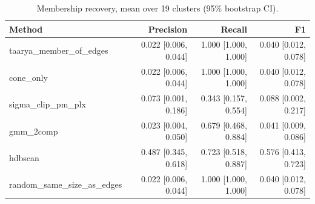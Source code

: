 \begin{table}[htbp]\centering\small
\caption{Membership recovery, mean over 19 clusters (95\% bootstrap CI).}\label{tab:membership_methods}
\begin{tabular}{lrrr}
\toprule
Method & Precision & Recall & F1 \\
\midrule
taarya\_member\_of\_edges & 0.022 [0.006, 0.044] & 1.000 [1.000, 1.000] & 0.040 [0.012, 0.078] \\
cone\_only & 0.022 [0.006, 0.044] & 1.000 [1.000, 1.000] & 0.040 [0.012, 0.078] \\
sigma\_clip\_pm\_plx & 0.073 [0.001, 0.186] & 0.343 [0.157, 0.554] & 0.088 [0.002, 0.217] \\
gmm\_2comp & 0.023 [0.004, 0.050] & 0.679 [0.468, 0.884] & 0.041 [0.009, 0.086] \\
hdbscan & 0.487 [0.345, 0.618] & 0.723 [0.518, 0.887] & 0.576 [0.413, 0.723] \\
random\_same\_size\_as\_edges & 0.022 [0.006, 0.044] & 1.000 [1.000, 1.000] & 0.040 [0.012, 0.078] \\
\bottomrule
\end{tabular}
\end{table}

